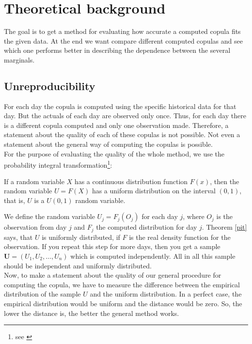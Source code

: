 \section{Theoretical background}\label{theo}

The goal is to get a method for evaluating how accurate a computed copula fits the given data. At the end we want compare different computed copulas and see which one performs better in describing the dependence between the several marginals.

\subsection{Unreproducibility}\label{unrep}

For each day the copula is computed using the specific historical data for that day. But the actuals of each day are observed only once. Thus, for each day there is a different copula computed and only one observation made. Therefore, a statement about the quality of each of these copulas is not possible. Not even a statement about the general way of computing the copulas is possible.\\

For the purpose of evaluating the quality of the whole method, we use the probability integral transformation\footnote{see \cite{stats}}:

\begin{theorem}\label{pit}
	If a random variable $X$ has a continuous distribution function $F(x)$, then the random variable $U=F(X)$ has a uniform distribution on the interval $(0,1)$, that is, $U$ is a $U(0,1)$ random variable.
\end{theorem}

We define the random variable $U_{j}=F_{j}(O_{j})$ for each day $j$, where $O_{j}$ is the observation from day $j$ and $F_{j}$ the computed distribution for day $j$. Theorem \ref{pit} says, that $U$ is uniformly distributed, if $F$ is the real density function for the observation. If you repeat this step for more days, then you get a sample $\boldsymbol{U}=(U_{1}, U_{2},\dots , U_{n})$ which is computed independently. All in all this sample should be independent and uniformly distributed.\\

Now, to make a statement about the quality of our general procedure for computing the copula, we have to measure the difference between the empirical distribution of the sample $U$ and the uniform distribution. In a perfect case, the empirical distribution would be uniform and the distance would be zero. So, the lower the distance is, the better the general method works.

